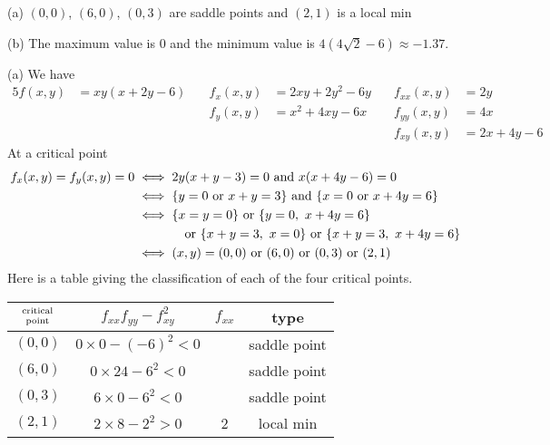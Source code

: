 %

\begin{answer}
(a) $(0,0)$, $(6,0)$, $(0,3)$ are saddle points and $(2,1)$ is a local min

(b) The maximum value is $0$ and the minimum value is $4(4\sqrt{2}-6)
\approx -1.37$.
\end{answer}

\begin{solution}
(a) We have
\begin{alignat*}{5}
f(x,y)&=xy(x+2y-6)\quad &
     f_x(x,y)&=2xy+2y^2-6y\quad &
     f_{xx}(x,y)&=2y \\
 & & f_y(x,y)&=x^2+4xy-6x &
     f_{yy}(x,y)&=4x\\
 & & & &f_{xy}(x,y)&=2x+4y-6
\end{alignat*}
At a critical point
\begin{align*}
f_x(x,y)=f_y(x,y)=0
&\iff 2y(x+y-3)=0\text{ and }x(x+4y-6)=0 \\
&\iff \{y=0\text{ or }x+y=3\}\text{ and }\{x=0\text{ or }x+4y=6\}\\
&\iff \{x=y=0\}\text{ or }\{y=0,\ x+4y=6\}\\
&\hskip0.5in\text{ or }\{x+y=3,\ x=0\}
                   \text{ or }\{x+y=3,\ x+4y=6\}\\
&\iff (x,y)=(0,0)\text{ or }(6,0)\text{ or }(0,3)\text{ or }(2,1)
\end{align*}
Here is a table giving the classification of each of the four critical
points.
\begin{center}
\renewcommand{\arraystretch}{1.3}
     \begin{tabular}{|c|c|c|c|}
     \hline
    $\Atop{\text{critical}}{\text{point}}$  & $f_{xx}f_{yy}-f_{xy}^2$ & 
                                                          $f_{xx}$ & type \\    
    \hline
     $(0,0)$   & $0\times 0-(-6)^2<0$   &    &saddle point \\ \hline
     $(6,0)$   & $0\times 24-6^2<0$     &    &saddle point \\  \hline
     $(0,3)$   & $6\times 0-6^2<0$      &    &saddle point \\  \hline
     $(2,1)$   & $2\times 8-2^2>0$      & 2  &local min \\  \hline
     \end{tabular}
\renewcommand{\arraystretch}{1.0}
\end{center}


\end{solution}
